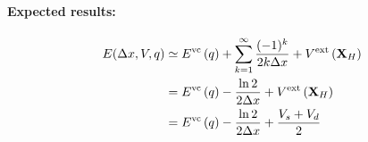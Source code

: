 \documentclass[a4paper]{article}
\begin{document}
\paragraph{Expected results:}
\begin{equation}
  \label{eq:mirrormirror}
  \begin{split}
  E(\Delta x,V,q) &\simeq E^{\text{vc}}\left(q\right) + \sum_{k=1}^\infty \frac{(-1)^k}{2k\Delta x} + V^{\text{ext}}\left(\mathbf{X}_H\right)    \\
                  &= E^{\text{vc}}\left(q\right) -\frac{\ln 2}{2\Delta x} + V^{\text{ext}}\left(\mathbf{X}_H\right) \\
                  &= E^{\text{vc}}\left(q\right) -\frac{\ln 2}{2\Delta x} + \frac{V_s+V_d}{2}
  \end{split}
\end{equation}
\end{document}
